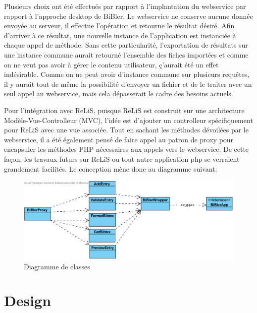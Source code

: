 \documentclass[12pt,titlepage]{article}
\let\oldsection\section
\renewcommand\section{\clearpage\oldsection}
\begin{document}
Plusieurs choix ont été effectués par rapport à l'implantation du webservice par rapport à l'approche desktop de BiBler. Le webservice ne conserve aucune donnée envoyée au serveur, il effectue l'opération et retourne le résultat désiré. Afin d'arriver à ce résultat, une nouvelle instance de l'application est instanciée à chaque appel de méthode. Sans cette particularité, l'exportation de résultats sur une instance commune aurait retourné l'ensemble des fiches importées et comme on ne veut pas avoir à gérer le contenu utilisateur, ç'aurait été un effet indésirable. Comme on ne peut avoir d'instance commune sur plusieurs requêtes, il y aurait tout de même la possibilité d'envoyer un fichier et de le traiter avec un seul appel au webservice, mais cela dépasserait le cadre des besoins actuels.\newline

Pour l'intégration avec ReLiS, puisque ReLiS est construit sur une architecture Modèle-Vue-Controlleur (MVC), l'idée est d'ajouter un controlleur spécifiquement pour ReLiS avec une vue associée. Tout en sachant les méthodes dévoilées par le webservice, il a été également pensé de faire appel au patron de proxy pour encapsuler les méthodes PHP nécessaires aux appels vers le webservice. De cette façon, les travaux futurs sur ReLiS ou tout autre application php se verraient grandement facilités. Le conception mène donc au diagramme suivant: 

\begin{figure}[h!]
\caption{Diagramme de classes}
\includegraphics{DomainClassDiagram.png}
\end{figure}

\section{Design}
\end{document}
